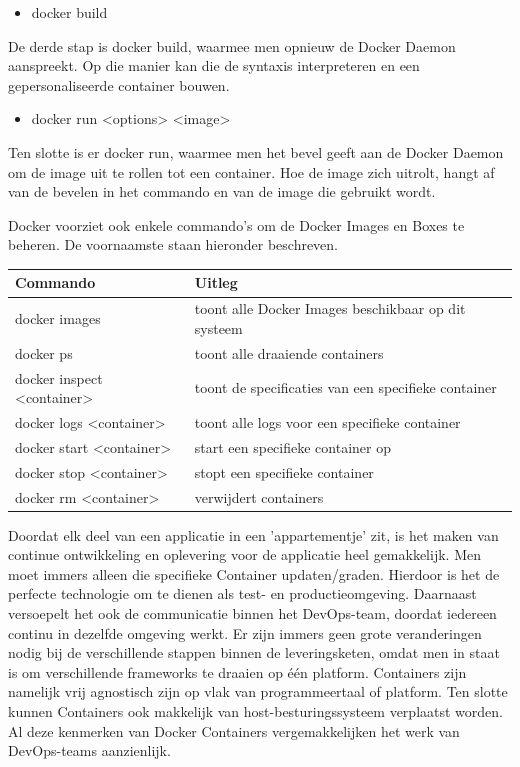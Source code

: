 \begin{itemize}[noitemsep]
	\item docker build
\end{itemize}
De derde stap is docker build, waarmee men opnieuw de Docker Daemon aanspreekt. Op die manier kan die de syntaxis interpreteren en een gepersonaliseerde container bouwen.

\begin{itemize}[noitemsep]
	\item docker run <options> <image>
\end{itemize}
Ten slotte is er docker run, waarmee men het bevel geeft aan de Docker Daemon om de image uit te rollen tot een container. Hoe de image zich uitrolt, hangt af van de bevelen in het commando en van de image die gebruikt wordt. 

Docker voorziet ook enkele commando's om de Docker Images en Boxes te beheren. De voornaamste staan hieronder beschreven.

\begin{tabular}{ll}
	\hline
	Commando & Uitleg \\
	\hline
	docker images & toont alle Docker Images beschikbaar op dit systeem \\
	docker ps & toont alle draaiende containers \\
	docker inspect <container> & toont de specificaties van een specifieke container \\
	docker logs <container> & toont alle logs voor een specifieke container \\
	docker start <container> & start een specifieke container op \\
	docker stop <container> & stopt een specifieke container \\
	docker rm <container> & verwijdert containers \\
	\hline
\end{tabular}

Doordat elk deel van een applicatie in een 'appartementje' zit, is het maken van continue ontwikkeling en oplevering voor de applicatie heel gemakkelijk. Men moet immers alleen die specifieke Container updaten/graden. Hierdoor is het de perfecte technologie om te dienen als test- en productieomgeving. Daarnaast versoepelt het ook de communicatie binnen het DevOps-team, doordat iedereen continu in dezelfde omgeving werkt. Er zijn immers geen grote veranderingen nodig bij de verschillende stappen binnen de leveringsketen, omdat men in staat is om verschillende frameworks te draaien op één platform. Containers zijn namelijk vrij agnostisch zijn op vlak van programmeertaal of platform. Ten slotte kunnen Containers ook makkelijk van host-besturingssysteem verplaatst worden. Al deze kenmerken van Docker Containers vergemakkelijken het werk van DevOps-teams aanzienlijk.

